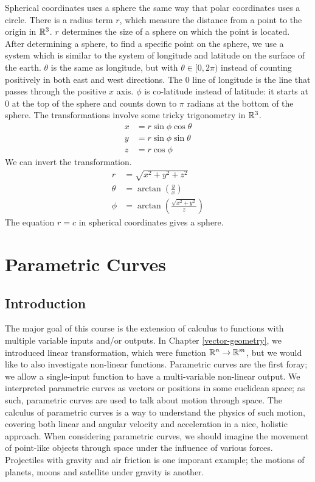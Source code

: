\documentclass[fleqn,letterpaper]{report}
\begin{document}
Spherical coordinates uses a sphere the same way that polar
coordinates uses a circle. There is a radius term $r$, which
measure the distance from a point to the origin in $\mathbb{R}^3$.
$r$ determines the size of a sphere on which the point is
located. After determining a sphere, to find a specific point
on the sphere, we use a system which is similar to the system
of longitude and latitude on the surface of the earth.
$\theta$ is the same as longitude, but with $\theta \in [0,
2\pi)$ instead of counting positively in both east and west
directions. The $0$ line of longitude is the line that passes
through the positive $x$ axis. $\phi$ is co-latitude instead
of latitude: it starts at $0$ at the top of the sphere and
counts down to $\pi$ radians at the bottom of the sphere. The
transformations involve some tricky trigonometry in $\mathbb{R}^3$.
\begin{align*}
x & = r \sin \phi \cos \theta \\
y & = r \sin \phi \sin \theta \\
z & = r \cos \phi
\end{align*}
We can invert the transformation.
\begin{align*}
r & = \sqrt{x^2 + y^2 + z^2} \\
\theta & = \arctan \left( \frac{y}{x} \right) \\
\phi & = \arctan \left( \frac{\sqrt{x^2 + y^2}}{z} \right) 
\end{align*}
The equation $r=c$ in spherical coordinates gives a sphere. 

\chapter{Parametric Curves}
\label{parametric-curves}

\section{Introduction}
\label{parametric-curves-introduction}

The major goal of this course is the extension of calculus to
functions with multiple variable inputs and/or outputs. In
Chapter \ref{vector-geometry}, we introduced linear
transformation, which were function $\mathbb{R}^n \rightarrow \mathbb{R}^m$,
but we would like to also investigate non-linear functions.
Parametric curves are the first foray; we allow a single-input
function to have a multi-variable non-linear output.  We
interpreted parametric curves as vectors or positions in some
euclidean space; as such, parametric curves are used to talk
about motion through space.  The calculus of parametric curves
is a way to understand the physics of such motion, covering
both linear and angular velocity and acceleration in a nice,
holistic approach. When considering parametric curves, we
should imagine the movement of point-like objects through
space under the influence of various forces.  Projectiles with
gravity and air friction is one imporant example; the motions
of planets, moons and satellite under gravity is another. 
\end{document}
